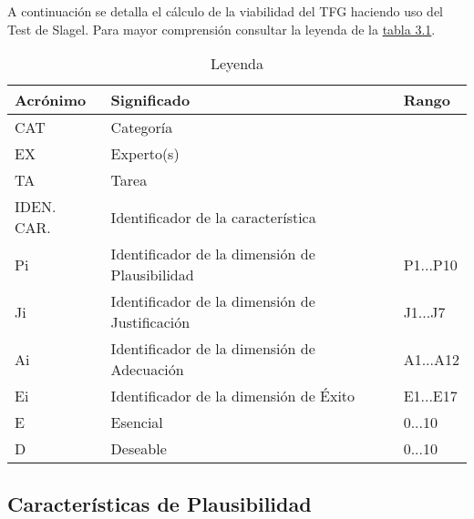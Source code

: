 A continuación se detalla el cálculo de la viabilidad del TFG haciendo uso del Test de Slagel.
Para mayor comprensión consultar la leyenda de la \hyperref[tab:table3_1]{tabla 3.1}.

\begin{table}[]
  \centering
  \caption{Leyenda}
  \label{tab:table3_1}
  \begin{tabular}{|l|l|l|}
    \hline
    Acrónimo & Significado & Rango \\ \hline
    CAT & Categoría &  \\ \hline
    EX & Experto(s) &  \\ \hline
    TA & Tarea &  \\ \hline
    IDEN. CAR. & Identificador de la característica &  \\ \hline
    Pi & Identificador de la dimensión de Plausibilidad & P1...P10 \\ \hline
    Ji & Identificador de la dimensión de Justificación & J1...J7 \\ \hline
    Ai & Identificador de la dimensión de Adecuación & A1...A12 \\ \hline
    Ei & Identificador de la dimensión de Éxito & E1...E17 \\ \hline
    E & Esencial & 0...10 \\ \hline
    D & Deseable & 0...10 \\ \hline
  \end{tabular}
\end{table}








\subsection{Características de Plausibilidad}

